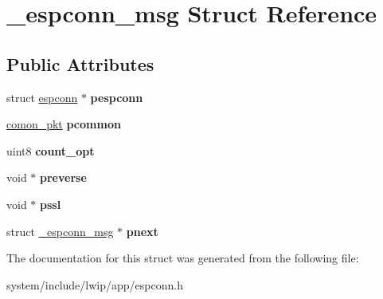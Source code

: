 \hypertarget{struct__espconn__msg}{}\section{\+\_\+espconn\+\_\+msg Struct Reference}
\label{struct__espconn__msg}
\subsection*{Public Attributes}
\begin{DoxyCompactItemize}
\item 
\hypertarget{struct__espconn__msg_ae88d0422568abbc6e815817f255daa0d}{}struct \hyperlink{structespconn}{espconn} $\ast$ {\bfseries pespconn}\label{struct__espconn__msg_ae88d0422568abbc6e815817f255daa0d}

\item 
\hypertarget{struct__espconn__msg_a24a0ff982546f365c4f63f0c201e8bb1}{}\hyperlink{struct__comon__pkt}{comon\+\_\+pkt} {\bfseries pcommon}\label{struct__espconn__msg_a24a0ff982546f365c4f63f0c201e8bb1}

\item 
\hypertarget{struct__espconn__msg_ab37370cc56ccb40b653639ad2d125a52}{}uint8 {\bfseries count\+\_\+opt}\label{struct__espconn__msg_ab37370cc56ccb40b653639ad2d125a52}

\item 
\hypertarget{struct__espconn__msg_a3e14ff653f15125ab08c7dbadf303125}{}void $\ast$ {\bfseries preverse}\label{struct__espconn__msg_a3e14ff653f15125ab08c7dbadf303125}

\item 
\hypertarget{struct__espconn__msg_af56a67915ee673d142964746dfae8edd}{}void $\ast$ {\bfseries pssl}\label{struct__espconn__msg_af56a67915ee673d142964746dfae8edd}

\item 
\hypertarget{struct__espconn__msg_af4930f6d69fb4cdc2b535d99831dd72a}{}struct \hyperlink{struct__espconn__msg}{\+\_\+espconn\+\_\+msg} $\ast$ {\bfseries pnext}\label{struct__espconn__msg_af4930f6d69fb4cdc2b535d99831dd72a}

\end{DoxyCompactItemize}


The documentation for this struct was generated from the following file\+:\begin{DoxyCompactItemize}
\item 
system/include/lwip/app/espconn.\+h\end{DoxyCompactItemize}
